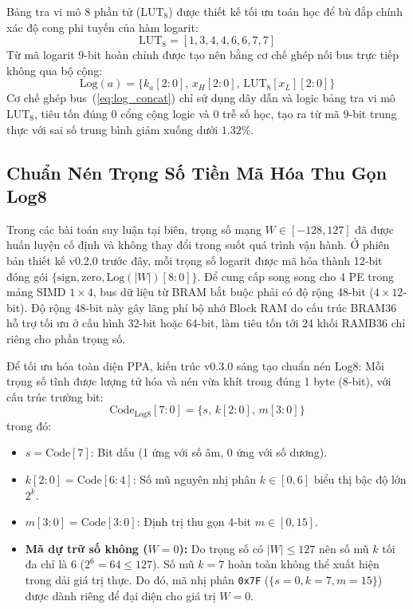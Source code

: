 \documentclass[conference]{IEEEtran}
\begin{document}
Bảng tra vi mô 8 phần tử ($\text{LUT}_8$) được thiết kế tối ưu toán học để bù đắp chính xác độ cong phi tuyến của hàm logarit:
\begin{equation}
    \text{LUT}_8 = [1, 3, 4, 4, 6, 6, 7, 7]
\end{equation}
Từ mã logarit 9-bit hoàn chỉnh được tạo nên bằng cơ chế ghép nối bus trực tiếp không qua bộ cộng:
\begin{equation}
    \text{Log}(a) = \{ k_a[2:0],\, x_H[2:0],\, \text{LUT}_8[x_L][2:0] \}
    \label{eq:log_concat}
\end{equation}
Cơ chế ghép bus~(\ref{eq:log_concat}) chỉ sử dụng dây dẫn và logic bảng tra vi mô $\text{LUT}_8$, tiêu tốn đúng 0 cổng cộng logic và 0 trễ số học, tạo ra từ mã 9-bit trung thực với sai số trung bình giảm xuống dưới $1.32\%$.

\subsection{Chuẩn Nén Trọng Số Tiền Mã Hóa Thu Gọn Log8}
\hspace*{1em} Trong các bài toán suy luận tại biên, trọng số mạng $W \in [-128, 127]$ đã được huấn luyện cố định và không thay đổi trong suốt quá trình vận hành. Ở phiên bản thiết kế v0.2.0 trước đây, mỗi trọng số logarit được mã hóa thành 12-bit đóng gói $\{ \text{sign}, \text{zero}, \text{Log}(|W|)[8:0] \}$. Để cung cấp song song cho 4 PE trong mảng SIMD $1\times 4$, bus dữ liệu từ BRAM bắt buộc phải có độ rộng 48-bit ($4 \times 12$-bit). Độ rộng 48-bit này gây lãng phí bộ nhớ Block RAM do cấu trúc BRAM36 hỗ trợ tối ưu ở cấu hình 32-bit hoặc 64-bit, làm tiêu tốn tới 24 khối RAMB36 chỉ riêng cho phần trọng số.

Để tối ưu hóa toàn diện PPA, kiến trúc v0.3.0 sáng tạo chuẩn nén Log8: Mỗi trọng số tĩnh được lượng tử hóa và nén vừa khít trong đúng 1 byte (8-bit), với cấu trúc trường bit:
\begin{equation}
    \text{Code}_{\text{Log8}}[7:0] = \{ s,\, k[2:0],\, m[3:0] \}
\end{equation}
trong đó:
\begin{itemize}
    \item $s = \text{Code}[7]$: Bit dấu (1 ứng với số âm, 0 ứng với số dương).
    \item $k[2:0] = \text{Code}[6:4]$: Số mũ nguyên nhị phân $k \in [0, 6]$ biểu thị bậc độ lớn $2^k$.
    \item $m[3:0] = \text{Code}[3:0]$: Định trị thu gọn 4-bit $m \in [0, 15]$.
    \item \textbf{Mã dự trữ số không ($W = 0$):} Do trọng số có $|W| \le 127$ nên số mũ $k$ tối đa chỉ là 6 ($2^6 = 64 \le 127$). Số mũ $k = 7$ hoàn toàn không thể xuất hiện trong dải giá trị thực. Do đó, mã nhị phân \texttt{0x7F} ($\{s=0, k=7, m=15\}$) được dành riêng để đại diện cho giá trị $W = 0$.
\end{itemize}
\end{document}
